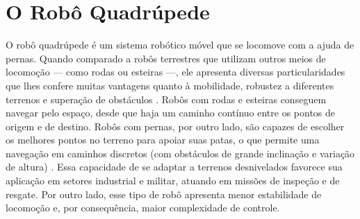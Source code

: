 \documentclass[conference]{IEEEtran}
\begin{document}



\section{O Robô Quadrúpede}

O robô quadrúpede é um sistema robótico móvel que se locomove com a ajuda de pernas. Quando comparado a robôs terrestres que utilizam outros meios de locomoção --- como rodas ou esteiras ---, ele apresenta diversas particularidades que lhes confere muitas vantagens quanto à mobilidade, robustez a diferentes terrenos e superação de obstáculos \cite{Biswal2021}. Robôs com rodas e esteiras conseguem navegar pelo espaço, desde que haja um caminho contínuo entre os pontos de origem e de destino. Robôs com pernas, por outro lado, são capazes de escolher os melhores pontos no terreno para apoiar suas patas, o que permite uma navegação em caminhos discretos (com obstáculos de grande inclinação e variação de altura) \cite{Yao2021}. Essa capacidade de se adaptar a terrenos desnivelados favorece sua aplicação em setores  industrial e militar, atuando em missões de inspeção e de resgate. Por outro lado, esse tipo de robô apresenta menor estabilidade de locomoção e, por consequência, maior complexidade de controle.
\end{document}
